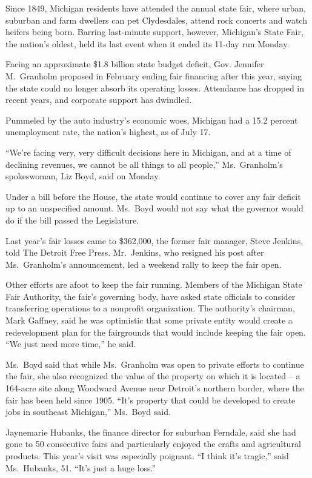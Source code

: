 ﻿\documentclass[12pt]{article}
\begin{document}
Since 1849, Michigan residents have attended the annual state fair, where urban, suburban and farm
dwellers can pet Clydesdales, attend rock concerts and watch heifers being born. Barring last-minute
support, however, Michigan's State Fair, the nation's oldest, held its last event when it ended its
11-day run Monday.

Facing an approximate \$1.8 billion state budget deficit, Gov. Jennifer M.~Granholm proposed in
February ending fair financing after this year, saying the state could no longer absorb its
operating losses. Attendance has dropped in recent years, and corporate support has dwindled.

Pummeled by the auto industry's economic woes, Michigan had a 15.2 percent unemployment rate, the
nation's highest, as of July 17.

``We're facing very, very difficult decisions here in Michigan, and at a time of declining revenues,
we cannot be all things to all people,'' Ms.~Granholm's spokeswoman, Liz Boyd, said on Monday.

Under a bill before the House, the state would continue to cover any fair deficit up to an
unspecified amount. Ms.~Boyd would not say what the governor would do if the bill passed the
Legislature.

Last year's fair losses came to \$362,000, the former fair manager, Steve Jenkins, told The Detroit
Free Press. Mr.~Jenkins, who resigned his post after Ms.~Granholm's announcement, led a weekend
rally to keep the fair open.

Other efforts are afoot to keep the fair running. Members of the Michigan State Fair Authority, the
fair's governing body, have asked state officials to consider transferring operations to a nonprofit
organization. The authority's chairman, Mark Gaffney, said he was optimistic that some private
entity would create a redevelopment plan for the fairgrounds that would include keeping the fair
open. ``We just need more time,'' he said.

Ms.~Boyd said that while Ms.~Granholm was open to private efforts to continue the fair, she also
recognized the value of the property on which it is located -- a 164-acre site along Woodward Avenue
near Detroit's northern border, where the fair has been held since 1905. ``It's property that could
be developed to create jobs in southeast Michigan,'' Ms.~Boyd said.

Jaynemarie Hubanks, the finance director for suburban Ferndale, said she had gone to 50 consecutive
fairs and particularly enjoyed the crafts and agricultural products. This year's visit was
especially poignant. ``I think it's tragic,'' said Ms.~Hubanks, 51. ``It's just a huge loss.''
\end{document}
